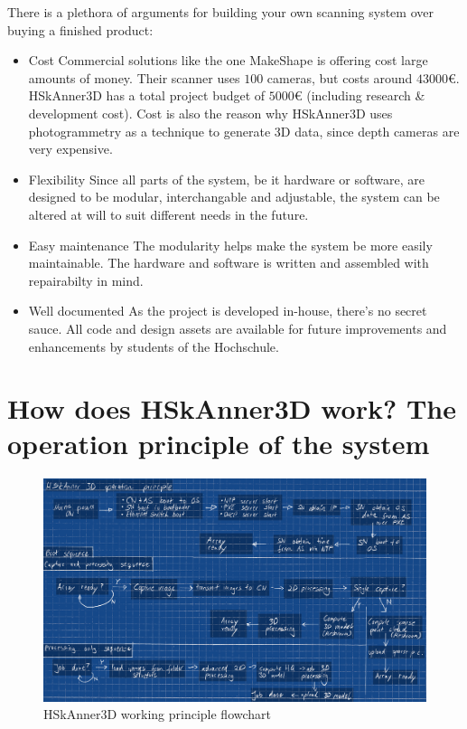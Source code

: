 	There is a plethora of arguments for building your own scanning system over buying a finished product:
	\begin{itemize}
		\item Cost \newline
			Commercial solutions like the one MakeShape is offering cost large amounts of money. Their scanner uses $100$ cameras, but costs around $43 000$\euro{}. HSkAnner3D has a total project budget of $5 000$\euro{} (including research \& development cost). Cost is also the reason why HSkAnner3D uses photogrammetry as a technique to generate 3D data, since depth cameras are very expensive.
		\item Flexibility \newline
			Since all parts of the system, be it hardware or software, are designed to be modular, interchangable and adjustable, the system can be altered at will to suit different needs in the future.
		\item Easy maintenance \newline
			The modularity helps make the system be more easily maintainable. The hardware and software is written and assembled with repairabilty in mind.
		\item Well documented \newline
			As the project is developed in-house, there's no secret sauce. All code and design assets are available for future improvements and enhancements by students of the Hochschule.
	\end{itemize}

\section{How does HSkAnner3D work? The operation principle of the system}
    \begin{figure}[H]
        \centerline{\includegraphics[width=\linewidth]{what/processing-chain-system.png}}
        \caption{HSkAnner3D working principle flowchart}
    \label{operation-flowchart-system}
    \end{figure}

